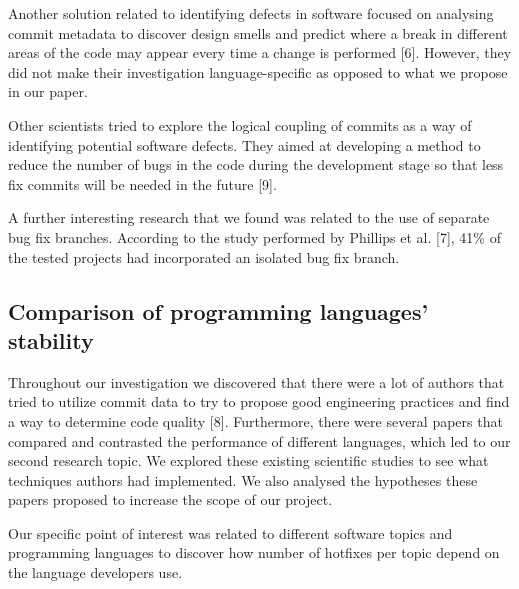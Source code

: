Another solution related to identifying defects in software focused on analysing commit metadata to discover design smells and predict where a break in different areas of the code may appear every time a change is performed [6]. However, they did not make their investigation language-specific as opposed to what we propose in our paper.\par

Other scientists tried to explore the logical coupling of commits as a way of identifying potential software defects. They aimed at developing a method to reduce the number of bugs in the code during the development stage so that less fix commits will be needed in the future [9].\par

A further interesting research that we found was related to the use of separate bug fix branches. According to the study performed by Phillips et al. [7], 41\% of the tested projects had incorporated an isolated bug fix branch.

\subsection{Comparison of programming languages' stability}
Throughout our investigation we discovered that there were a lot of authors that tried to utilize commit data to try to propose good engineering practices and find a way to determine code quality [8]. Furthermore, there were several papers that compared and contrasted the performance of different languages, which led to our second research topic. We explored these existing scientific studies to see what techniques authors had implemented. We also analysed the hypotheses these papers proposed to increase the scope of our project.\par

Our specific point of interest was related to different software topics and programming languages to discover how number of hotfixes per topic depend on the language developers use.\par

